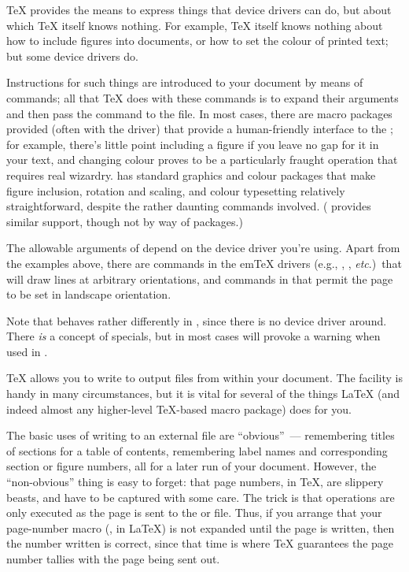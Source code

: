 
\TeX{} provides the means to express things that device drivers can
do, but about which \TeX{} itself knows nothing.  For example, \TeX{}
itself knows nothing about how to include \PS{} figures into
documents, or how to set the colour of printed text; but some device
drivers do.

Instructions for such things are introduced to your document by means
of  commands; all that \TeX{} does with these commands is
to expand their 
arguments and then pass the command to the  file.  In most
cases, there are macro packages provided (often with the driver) that
provide a human-friendly interface to the ; for example,
there's little point including a figure if you leave no gap for it in
your text, and changing colour proves to be a particularly fraught
operation that requires real wizardry.  \LaTeXe{}
has standard graphics and colour packages that make figure inclusion,
rotation and scaling, and colour typesetting relatively
straightforward, despite the rather daunting  commands
involved.  (\CONTeXT{} provides similar support, though not by way of
packages.)

The allowable arguments of  depend on the device driver
you're using.  Apart from the examples above, there are 
commands in the em\TeX{} drivers (e.g., , ,
\emph{etc}.)~that will draw lines at arbitrary orientations, and
commands in  that permit the page to be set in
landscape orientation.

Note that  behaves rather differently in \PDFTeX{}, since
there is no device driver around.  There \emph{is} a concept of
 specials, but in most cases  will provoke a
warning when used in \PDFTeX{}.


\TeX{} allows you to write to output files from within your document.
The facility is handy in many circumstances, but it is vital for
several of the things \LaTeX{} (and indeed almost any higher-level
\TeX{}-based macro package) does for you.

The basic uses of writing to an external file are ``obvious''~---
remembering titles of sections for a table of contents, remembering
label names and corresponding section or figure numbers, all for a
later run of your document.  However, the ``non-obvious'' thing is
easy to forget: that page numbers, in \TeX{}, are slippery beasts, and
have to be captured with some care.  The trick is that 
operations are only executed as the page is sent to the 
or  file.  Thus, if you arrange that your page-number macro
(, in \LaTeX{}) is not expanded until the page is
written, then the number written is correct, since that time is where
\TeX{} guarantees the page number tallies with the page being sent
out.

